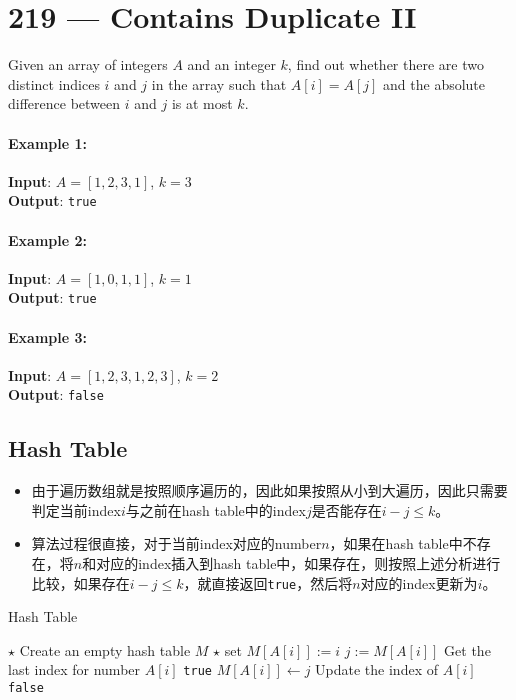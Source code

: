 \section{219 --- Contains Duplicate II}
Given an array of integers $A$ and an integer $k$, find out whether there are two distinct indices $i$ and $j$ in the array such that $A[i] = A[j]$ and the absolute difference between $i$ and $j$ is at most $k$.
\paragraph{Example 1:}
\begin{flushleft}
\textbf{Input}: $A = [1,2,3,1]$, $k = 3$
\\
\textbf{Output}: \texttt{true}
\end{flushleft}

\paragraph{Example 2:}
\begin{flushleft}
\textbf{Input}: $A = [1,0,1,1]$, $k = 1$
\\
\textbf{Output}: \texttt{true}
\end{flushleft}
\paragraph{Example 3:}
\begin{flushleft}
\textbf{Input}: $A = [1,2,3,1,2,3]$, $k = 2$
\\
\textbf{Output}: \texttt{false}
\end{flushleft}
\subsection{Hash Table}
\begin{CJK*}{UTF8}{gbsn}
\begin{itemize}
    \item 由于遍历数组就是按照顺序遍历的，因此如果按照从小到大遍历，因此只需要判定当前index$i$与之前在hash table中的index$j$是否能存在$i-j\leq k$。
    \item 算法过程很直接，对于当前index对应的number$n$，如果在hash table中不存在，将$n$和对应的index插入到hash table中，如果存在，则按照上述分析进行比较，如果存在$i-j\leq k$，就直接返回\texttt{true}，然后将$n$对应的index更新为$i$。
\end{itemize}
\end{CJK*}
\setcounter{algorithm}{0}
\begin{algorithm}[H]
\caption{Hash Table}
\begin{algorithmic}[1]
\State $\star$ Create an empty hash table $M$
\State $\star$ set $M[A[i]]:=i$
\Else
\State $j:=M[A[i]]$ \Comment Get the last index for number $A[i]$
\State \Return \texttt{true}
\Else
\State $M[A[i]]\gets j$ \Comment Update the index of $A[i]$
\EndIf
\EndIf
\EndFor
\State \Return \texttt{false}
\EndProcedure
\end{algorithmic}
\end{algorithm}

